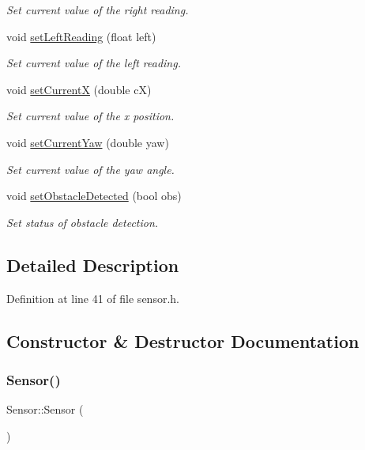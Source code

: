 \begin{DoxyCompactItemize}
\begin{DoxyCompactList}\small\item\em Set current value of the right reading. \end{DoxyCompactList}\item 
void \mbox{\hyperlink{class_sensor_a510ede2de9130fb4dad6306606524f55}{set\+Left\+Reading}} (float left)
\begin{DoxyCompactList}\small\item\em Set current value of the left reading. \end{DoxyCompactList}\item 
void \mbox{\hyperlink{class_sensor_a380fab1afde78a51e06ae1498164bfc7}{set\+CurrentX}} (double cX)
\begin{DoxyCompactList}\small\item\em Set current value of the x position. \end{DoxyCompactList}\item 
void \mbox{\hyperlink{class_sensor_a725c0cc64bdf279e35f9ca4e96d8235d}{set\+Current\+Yaw}} (double yaw)
\begin{DoxyCompactList}\small\item\em Set current value of the yaw angle. \end{DoxyCompactList}\item 
void \mbox{\hyperlink{class_sensor_ae3914c5ebf7891ec734c4d17e7c4cd3d}{set\+Obstacle\+Detected}} (bool obs)
\begin{DoxyCompactList}\small\item\em Set status of obstacle detection. \end{DoxyCompactList}\end{DoxyCompactItemize}


\subsection{Detailed Description}


Definition at line 41 of file sensor.\+h.



\subsection{Constructor \& Destructor Documentation}
\mbox{\label{class_sensor_a342d6d11ef572c8cba92cb76fb1a294b}} 
\subsubsection{\texorpdfstring{Sensor()}{Sensor()}}
{\footnotesize\ttfamily Sensor\+::\+Sensor (\begin{DoxyParamCaption}{ }\end{DoxyParamCaption})}



